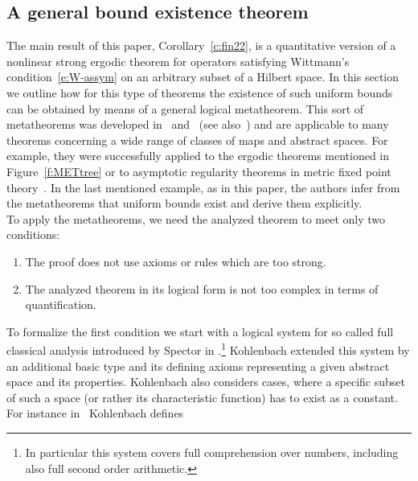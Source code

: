 \subsection{A general bound existence theorem}\label{s:Meta}

The main result of this paper, Corollary~\ref{c:fin22}, is a quantitative version
of a nonlinear strong ergodic theorem for 
operators satisfying Wittmann's condition~\eqref{e:W-assym} 
on an arbitrary subset of a Hilbert space. In this section
we outline how for this type of theorems the existence of such uniform bounds 
can be obtained by means of a general logical metatheorem. This sort of 
metatheorems was developed in~\cite{Kohlenbach05meta} and~\cite{GK08} (see also~\cite{Kohlenbach08})
and are applicable to many theorems concerning a wide range of classes of maps and abstract spaces. 
For example, they were successfully applied to 
the ergodic theorems mentioned in Figure~\ref{f:METtree} or to 
asymptotic regularity theorems in metric fixed point theory~\cite{Kohlenbach2010}.
In the last mentioned example, as in this paper, 
the authors infer from the metatheorems that uniform bounds exist and derive them explicitly.\\
To apply the metatheorems, we need the analyzed theorem to meet only two conditions:
\begin{enumerate}
\item The proof does not use axioms or rules which are too strong.
\item The analyzed theorem in its logical form is not too complex in terms of quantification.
\end{enumerate}
To formalize the first condition we start with a logical system for so called full classical analysis
introduced by Spector in \cite{Spector62}.\footnote{In particular this system covers full comprehension
over numbers, including also full second order arithmetic.} Kohlenbach
extended this system by an additional basic type and its defining axioms representing a given abstract space
and its properties. Kohlenbach also considers cases, where a specific subset of such a space 
(or rather its characteristic function) has to exist as a constant. For instance in~\cite{Kohlenbach08} Kohlenbach defines 
